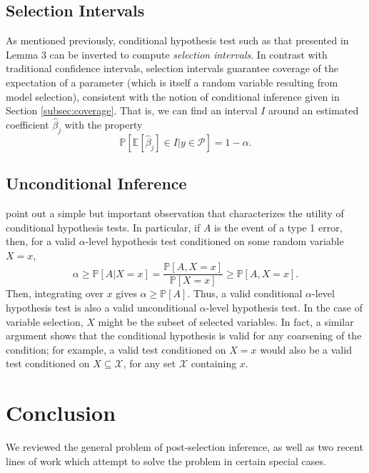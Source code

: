 \documentclass{article}
\newcommand{\X}{\mathcal{X}}
\newcommand{\pr}{\mathbb{P}}
\newcommand{\E}{\mathbb{E}}
\newcommand{\poly}{\mathcal{P}}
\renewcommand{\hat}{\widehat}
\begin{document}
\subsection{Selection Intervals}
\label{subsec:select_ints}
As mentioned previously, conditional hypothesis test such as that presented in
Lemma 3 can be inverted to compute \emph{selection intervals}. In contrast with
traditional confidence intervals, selection intervals guarantee coverage of the
expectation of a parameter (which is itself a random variable resulting from
model selection), consistent with the notion of conditional inference given in
Section \ref{subsec:coverage}. That is, we can find an interval $I$ around an
estimated coefficient $\hat\beta_j$ with the property
\[\pr\left[ \E[\hat\beta_j] \in I | y \in \poly \right] = 1 - \alpha.\]

\subsection{Unconditional Inference}
\citet{taylor14post} point out a simple but important observation that
characterizes the utility of conditional hypothesis tests. In particular, if
$A$ is the event of a type 1 error, then, for a valid $\alpha$-level hypothesis
test conditioned on some random variable $X = x$,
\[\alpha \geq \pr\left[ A | X = x \right]
    = \frac{\pr\left[ A,X = x \right]}{\pr\left[ X = x \right]}
    \geq \pr\left[ A,X = x \right].\]
Then, integrating over $x$ gives $\alpha \geq \pr\left[ A \right]$. Thus, a
valid conditional $\alpha$-level hypothesis test is also a valid unconditional
$\alpha$-level hypothesis test. In the case of variable selection, $X$ might be
the subset of selected variables. In fact, a similar argument shows that the
conditional hypothesis is valid for any coarsening of the condition; for
example, a valid test conditioned on $X = x$ would also be a valid test
conditioned on $X \subseteq \X$, for any set $\X$ containing $x$.

\section{Conclusion}
We reviewed the general problem of post-selection inference, as well as two
recent lines of work which attempt to solve the problem in certain special
cases.

\small{


}
\end{document}
